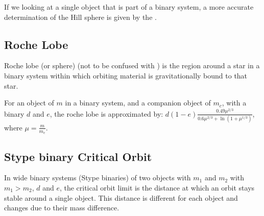 \documentclass[letterpaper,10pt,english]{sphinxmanual}
\begin{document}
\sphinxAtStartPar
If we looking at a single object that is part of a binary system, a more accurate determination
of the Hill sphere is given by the {\hyperref[\detokenize{quantities/orbital/roche_lobe:id1}]{}}.


\subsection{Roche Lobe}
\label{\detokenize{quantities/children_orbit_limits/roche_lobe:roche-lobe}}\label{\detokenize{quantities/children_orbit_limits/roche_lobe::doc}}\label{\detokenize{quantities/children_orbit_limits/roche_lobe:id1}}
\sphinxAtStartPar
Roche lobe (or sphere) (not to be confused with {\hyperref[\detokenize{quantities/children_orbit_limits/roche_limit:id1}]{}}) is the region
around a star in a binary system within which orbiting material is gravitationally bound to that star.

\sphinxAtStartPar
For an object of {\hyperref[\detokenize{quantities/material/mass:id1}]{}} \(m\) in a binary system, and a companion object of
{\hyperref[\detokenize{quantities/material/mass:id1}]{}} \(m_c\), with a binary  {\hyperref[\detokenize{quantities/orbital/semi_major_axis:id1}]{}} \(d\)
and {\hyperref[\detokenize{quantities/orbital/eccentricity:id1}]{}} \(e\), the roche lobe is approximated by:
\(d (1 - e) \frac{0.49 \mu^{2/3}}{0.6\mu^{2/3} + \ln{\left(1 + \mu^{1/3}\right)}}\), where
\(\mu = \frac{m}{m_c}\).


\subsection{S\sphinxhyphen{}type binary Critical Orbit}
\label{\detokenize{quantities/children_orbit_limits/s_type_critical_orbit:s-type-binary-critical-orbit}}\label{\detokenize{quantities/children_orbit_limits/s_type_critical_orbit::doc}}\label{\detokenize{quantities/children_orbit_limits/s_type_critical_orbit:s-type-critical-orbit}}
\sphinxAtStartPar
In wide binary systems (S\sphinxhyphen{}type binaries) of two objects with {\hyperref[\detokenize{quantities/material/mass:id1}]{}}
\(m_1\) and \(m_2\) with \(m_1 > m_2\), {\hyperref[\detokenize{quantities/orbital/semi_major_axis:id1}]{}} \(d\)
and {\hyperref[\detokenize{quantities/orbital/eccentricity:id1}]{}} \(e\), the critical orbit limit is the 
distance at which an orbit stays stable around a single object.
This distance is different for each object and changes due to their mass difference.
\end{document}
